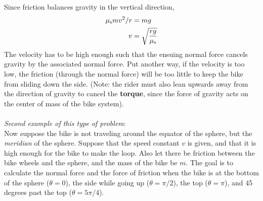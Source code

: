 \documentclass[12pt]{article}
\begin{document}
Since friction balances gravity in the vertical direction,
\begin{align}
\mu_{\rm s} mv^2/r &= mg \\
v &= \sqrt{\frac{rg}{\mu_{\rm s}}}
\end{align}
The velocity has to be high enough such that the ensuing normal force cancels gravity by the associated normal force.  Put another way, if the velocity is too low, the friction (through the normal force) will be too little to keep the bike from sliding down the side.  (Note: the rider must also lean upwards away from the direction of gravity to cancel the \textbf{torque}, since the force of gravity acts on the center of mass of the bike system).\\ \\
\textit{Second example of this type of problem}: \\
Now suppose the bike is not traveling around the equator of the sphere, but the \textit{meridian} of the sphere.  Suppose that the speed constant $v$ is given, and that it is high enough for the bike to make the loop.  Also let there be friction between the bike wheels and the sphere, and the mass of the bike be $m$.  The goal is to calculate the normal force and the force of friction when the bike is at the bottom of the sphere ($\theta = 0$), the side while going up ($\theta = \pi/2$), the top ($\theta = \pi$), and 45 degrees past the top ($\theta = 5\pi/4$).
\end{document}
